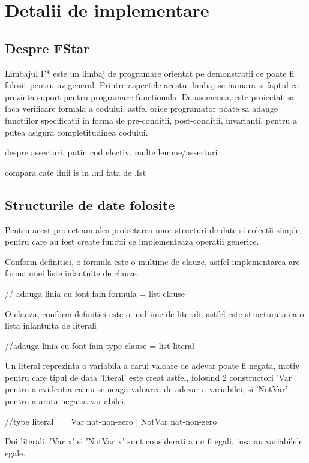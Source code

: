 \chapter{Detalii de implementare}


\section{Despre FStar}

Limbajul F* este un limbaj de programare orientat pe demonstratii ce poate fi folosit pentru uz general. Printre aspectele acestui limbaj se numara si faptul ca prezinta suport pentru programare functionala. De asemenea, este proiectat sa faca verificare formala a codului, astfel orice programator poate sa adauge functiilor specificatii in forma de pre-conditii, post-conditii, invarianti, pentru a putea asigura completitudinea codului.



despre asserturi, putin cod efectiv, multe lemme/asserturi

compara cate linii is in .ml fata de .fst


\section{Structurile de date folosite}

Pentru acest proiect am ales proiectarea unor structuri de date si colectii simple, pentru care au fost create functii ce implementeaza operatii generice.

Conform definitiei, o formula este o multime de clauze, astfel implementarea are forma unei liste inlantuite de clauze.

// adauga linia cu font fain formula = list clause

O clauza, conform definitiei este o multime de literali, astfel este structurata ca o lista inlantuita de literali

//adauga linia cu font fain type clause = list literal

\newpage

Un literal reprezinta o variabila a carui valoare de adevar poate fi negata, motiv pentru care tipul de data 'literal' este creat astfel, folosind 2 constructori 'Var' pentru a evidentia ca nu se neaga valoarea de adevar a variabilei, si 'NotVar' pentru a arata negatia variabilei.

//type literal = 
	| Var nat-non-zero
	| NotVar nat-non-zero
	
Doi literali, 'Var x' si 'NotVar x' sunt considerati a nu fi egali, insa au variabilele egale.
	
